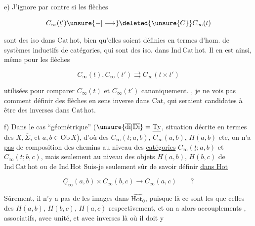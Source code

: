
e) J'ignore par contre si les flèches

\[
C_\infty(\underline t')\unsure{-|\longrightarrow}\deleted{\unsure{C}}C_\infty(t)
\]

sont des iso dans $\mathrm{Cat\,hot}$, bien qu'elles soient définies en termes d'hom. de systèmes inductifs de catégories, qui sont des iso. dans $\mathrm{Ind\,Cat\,hot}$. Il en est ainsi, même pour les flèches 

\[
C_\infty(\underline t),C_\infty(\underline t')\rightrightarrows C_\infty(t\times t')
\]

utilisées pour comparer $C_\infty(t)$ et $C_\infty(t')$ canoniquement. , je ne vois pas comment définir des flèches en sens inverse dans $\mathrm{Cat}$, qui seraient candidates à être des inverses dans $\mathrm{Cat\,hot}$.

f) Dans le cas ``géométrique'' ($\unsure{\overline{\mathrm{di}}|\overline{\mathrm{Di}}}=\underline{\mathrm{Ty}}$, situation décrite en termes des $X,\overline\Sigma$,  et $a,b\in\mathrm{Ob}\,X$), d'où des $C_\infty(\underline t;a,b)$, $C_\infty(a,b)$, $H(a,b)$ etc, on n'a \uline{pas}  de composition des chemins au niveau des \uline{catégories} $C_\infty(\underline t;a,b)$ et $C_\infty(t;b,c)$, mais seulement au niveau des objets  $H(a,b)$, $H(b,c)$ de $\mathrm{Ind\,Cat\,hot}$ ou de $\mathrm{Ind\,Hot}$ Suis-je seulement sûr de savoir définir \uline{dans Hot}

\[
\underline C_\infty(a,b)\times C_\infty(b,c)\longrightarrow C_\infty(a,c)\qquad ?
\]

Sûrement, il n'y a pas de   les images dans $\widehat{\mathrm{Hot}_0}$, puisque là ce sont les  que celles des $H(a,b)$, $H(b,c)$, $H(a,c)$ respectivement, et on a alors accouplements , associatifs, avec unité, et avec inverses  là où il doit y

